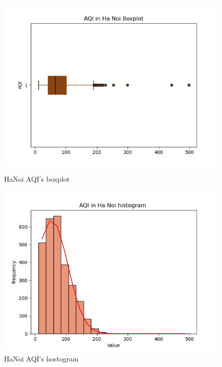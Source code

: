 \documentclass[conference]{IEEEtran}
\begin{document}
\begin{figure}[H]
    \centering
    \begin{minipage}{0.23\textwidth}
        \centering
        \includegraphics[width=1\textwidth]{bibliography/figure/Analysis-Dataset/hn_box.png}
        \caption{HaNoi AQI's boxplot}
        \label{fig:1}
    \end{minipage}
    \hfill
    \begin{minipage}{0.23\textwidth}
        \centering
        \includegraphics[width=1\textwidth]{bibliography/figure/Analysis-Dataset/hn_his.png}
        \caption{HaNoi AQI's hostogram}
        \label{fig:2}
    \end{minipage}
\end{figure}
\end{document}
